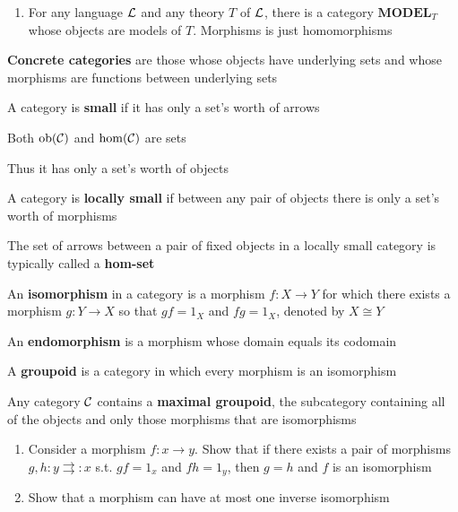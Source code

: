 \documentclass[11pt]{article}
\def \MODEL {\textbf{MODEL}}
\begin{document}
\begin{examplle}[]
\begin{enumerate}
\item For any language \(\mathcal{L}\) and any theory \(T\) of \(\mathcal{L}\), there is a category \(\MODEL_T\) whose
objects are models of \(T\). Morphisms is just homomorphisms
\end{enumerate}
\end{examplle}

\textbf{Concrete categories} are those whose objects have underlying sets and whose morphisms are
functions between underlying sets

\begin{definition}[]
A category is \textbf{small} if it has only a set's worth of arrows

Both \(\operatorname{ob}(\mathcal{C})\) and \(\operatorname{hom}(\mathcal{C})\) are sets
\end{definition}

Thus it has only a set's worth of objects

\begin{definition}[]
A category is \textbf{locally small} if between any pair of objects there is only a set's worth of morphisms
\end{definition}

The set of arrows between a pair of fixed objects in a locally small category is typically
called a \textbf{hom-set}


\begin{definition}[]
An \textbf{isomorphism} in a category is a morphism \(f:X\to Y\) for which there exists a
morphism \(g:Y\to X\) so that \(gf=1_X\) and \(fg=1_X\), denoted by \(X\cong Y\)
\end{definition}

An \textbf{endomorphism} is a morphism whose domain equals its codomain

\begin{definition}[]
A \textbf{groupoid} is a category in which every morphism is an isomorphism
\end{definition}

\begin{lemma}[]
Any category \(\mathcal{C}\) contains a \textbf{maximal groupoid}, the subcategory containing all of the objects
and only those morphisms that are isomorphisms
\end{lemma}

\begin{exercise}
\label{1.1.1}
\begin{enumerate}
\item Consider a morphism \(f:x\to y\). Show that if there exists a pair of
morphisms \(g,h:y\rightrightarrows:x\) s.t. \(gf=1_x\) and \(fh=1_y\), then \(g=h\) and \(f\)
is an isomorphism
\item Show that a morphism can have at most one inverse isomorphism
\end{enumerate}
\end{exercise}
\end{document}
